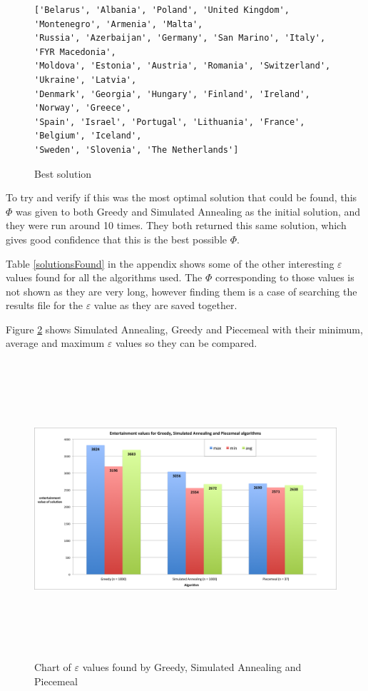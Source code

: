 \documentclass[12pt]{report}
\begin{document}
\begin{figure}[H]
\caption{Best solution}
\label{bestSolution}
\begin{verbatim}
['Belarus', 'Albania', 'Poland', 'United Kingdom', 'Montenegro', 'Armenia', 'Malta', 
'Russia', 'Azerbaijan', 'Germany', 'San Marino', 'Italy', 'FYR Macedonia', 
'Moldova', 'Estonia', 'Austria', 'Romania', 'Switzerland', 'Ukraine', 'Latvia', 
'Denmark', 'Georgia', 'Hungary', 'Finland', 'Ireland', 'Norway', 'Greece', 
'Spain', 'Israel', 'Portugal', 'Lithuania', 'France', 'Belgium', 'Iceland', 
'Sweden', 'Slovenia', 'The Netherlands']
\end{verbatim}
\end{figure}

To try and verify if this was the most optimal solution that could be found, this $\Phi$ was given to both Greedy and Simulated Annealing as the initial solution, and they were run around 10 times. They both returned this same solution, which gives good confidence that this is the best possible $\Phi$.

Table \ref{solutionsFound} in the appendix shows some of the other interesting $\varepsilon$ values found for all the algorithms used. The $\Phi$ corresponding to those values is not shown as they are very long, however finding them is a case of searching the results file for the $\varepsilon$ value as they are saved together.

Figure \ref{eScreenshot} shows Simulated Annealing, Greedy and Piecemeal with their minimum, average and maximum $\varepsilon$ values so they can be compared.

\begin{figure}[H]
\centering
\includegraphics[width=18cm, height=11cm]{./entertainmentValues}
\caption{Chart of $\varepsilon$ values found by Greedy, Simulated Annealing and Piecemeal}
\label{eScreenshot}
\end{figure}
\end{document}
